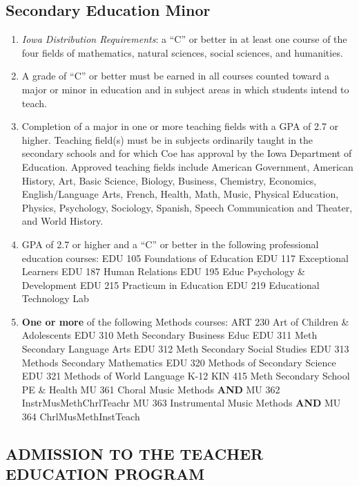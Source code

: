 \documentclass[
  letterpaper,
]{scrbook}
\providecommand{\tightlist}{%
  \setlength{\itemsep}{0pt}\setlength{\parskip}{0pt}}
\begin{document}
\subsection{Secondary Education Minor}\label{secondary-education-minor}

\begin{enumerate}
\def\labelenumi{\arabic{enumi}.}
\tightlist
\item
  \emph{Iowa Distribution Requirements}: a ``C'' or better in at least
  one course of the four fields of mathematics, natural sciences, social
  sciences, and humanities.
\item
  A grade of ``C'' or better must be earned in all courses counted
  toward a major or minor in education and in subject areas in which
  students intend to teach.
\item
  Completion of a major in one or more teaching fields with a GPA of 2.7
  or higher. Teaching field(s) must be in subjects ordinarily taught in
  the secondary schools and for which Coe has approval by the Iowa
  Department of Education. Approved teaching fields include American
  Government, American History, Art, Basic Science, Biology, Business,
  Chemistry, Economics, English/Language Arts, French, Health, Math,
  Music, Physical Education, Physics, Psychology, Sociology, Spanish,
  Speech Communication and Theater, and World History.
\item
  GPA of 2.7 or higher and a ``C'' or better in the following
  professional education courses: EDU 105 Foundations of Education EDU
  117 Exceptional Learners EDU 187 Human Relations EDU 195 Educ
  Psychology \& Development EDU 215 Practicum in Education EDU 219
  Educational Technology Lab
\item
  \textbf{One or more} of the following Methods courses: ART 230 Art of
  Children \& Adolescents EDU 310 Meth Secondary Business Educ EDU 311
  Meth Secondary Language Arts EDU 312 Meth Secondary Social Studies EDU
  313 Methods Secondary Mathematics EDU 320 Methods of Secondary Science
  EDU 321 Methods of World Language K-12 KIN 415 Meth Secondary School
  PE \& Health MU 361 Choral Music Methods \textbf{AND} MU 362
  InstrMusMethChrlTeachr MU 363 Instrumental Music Methods \textbf{AND}
  MU 364 ChrlMusMethInstTeach
\end{enumerate}

\subsection{ADMISSION TO THE TEACHER EDUCATION
PROGRAM}\label{admission-to-the-teacher-education-program}
\end{document}

